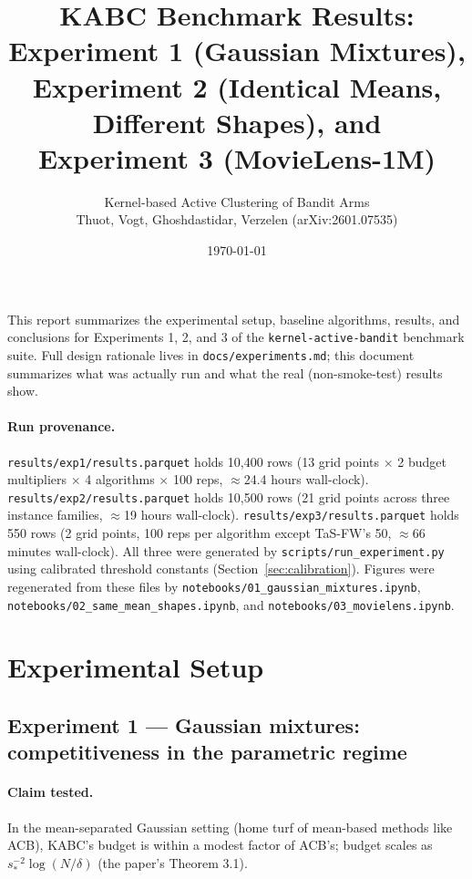 \documentclass[11pt]{article}
\title{KABC Benchmark Results: Experiment 1 (Gaussian Mixtures),\\ Experiment 2 (Identical Means, Different Shapes), and\\ Experiment 3 (MovieLens-1M)}
\author{Kernel-based Active Clustering of Bandit Arms\\
\small Thuot, Vogt, Ghoshdastidar, Verzelen (arXiv:2601.07535)}
\date{\today}
\begin{document}
\maketitle

\noindent This report summarizes the experimental setup, baseline algorithms,
results, and conclusions for Experiments 1, 2, and 3 of the \texttt{kernel-active-bandit}
benchmark suite. Full design rationale lives in \texttt{docs/experiments.md}; this
document summarizes what was actually run and what the real (non-smoke-test)
results show.

\paragraph{Run provenance.} \texttt{results/exp1/results.parquet} holds 10{,}400 rows
(13 grid points $\times$ 2 budget multipliers $\times$ 4 algorithms $\times$ 100 reps,
$\approx$24.4 hours wall-clock). \texttt{results/exp2/results.parquet} holds 10{,}500
rows (21 grid points across three instance families, $\approx$19 hours wall-clock).
\texttt{results/exp3/results.parquet} holds 550 rows
(2 grid points, 100 reps per algorithm except TaS-FW's 50, $\approx$66 minutes
wall-clock). All three were generated by \texttt{scripts/run\_experiment.py} using
calibrated threshold constants (Section~\ref{sec:calibration}). Figures were
regenerated from these files by \texttt{notebooks/01\_gaussian\_mixtures.ipynb},
\texttt{notebooks/02\_same\_mean\_shapes.ipynb}, and
\texttt{notebooks/03\_movielens.ipynb}.

\tableofcontents

\section{Experimental Setup}

\subsection{Experiment 1 --- Gaussian mixtures: competitiveness in the parametric regime}

\paragraph{Claim tested.} In the mean-separated Gaussian setting (home turf of
mean-based methods like ACB), KABC's budget is within a modest factor of ACB's;
budget scales as $s_*^{-2}\log(N/\delta)$ (the paper's Theorem 3.1).
\end{document}
